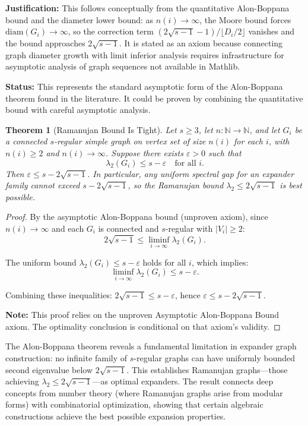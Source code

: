\documentclass[11pt]{article}
\theoremstyle{plain}
\newtheorem*{theorem}{Theorem}
\theoremstyle{definition}
\theoremstyle{remark}
\begin{document}
\textbf{Justification:} This follows conceptually from the quantitative Alon-Boppana bound and the diameter lower bound: as $n(i) \to \infty$, the Moore bound forces $\text{diam}(G_i) \to \infty$, so the correction term $(2\sqrt{s-1} - 1)/\lfloor D_i/2 \rfloor$ vanishes and the bound approaches $2\sqrt{s-1}$. It is stated as an axiom because connecting graph diameter growth with limit inferior analysis requires infrastructure for asymptotic analysis of graph sequences not available in Mathlib.

\textbf{Status:} This represents the standard asymptotic form of the Alon-Boppana theorem found in the literature. It could be proven by combining the quantitative bound with careful asymptotic analysis.

\begin{theorem}[Ramanujan Bound Is Tight]
Let $s \geq 3$, let $n : \mathbb{N} \to \mathbb{N}$, and let $G_i$ be a connected $s$-regular simple graph on vertex set of size $n(i)$ for each $i$, with $n(i) \geq 2$ and $n(i) \to \infty$. Suppose there exists $\varepsilon > 0$ such that
\[
\lambda_2(G_i) \leq s - \varepsilon \quad \text{for all } i.
\]
Then $\varepsilon \leq s - 2\sqrt{s-1}$. In particular, any uniform spectral gap for an expander family cannot exceed $s - 2\sqrt{s-1}$, so the Ramanujan bound $\lambda_2 \leq 2\sqrt{s-1}$ is best possible.
\end{theorem}

\begin{proof}
By the asymptotic Alon-Boppana bound (unproven axiom), since $n(i) \to \infty$ and each $G_i$ is connected and $s$-regular with $|V_i| \geq 2$:
\[
2\sqrt{s-1} \leq \liminf_{i \to \infty} \lambda_2(G_i).
\]

The uniform bound $\lambda_2(G_i) \leq s - \varepsilon$ holds for all $i$, which implies:
\[
\liminf_{i \to \infty} \lambda_2(G_i) \leq s - \varepsilon.
\]

Combining these inequalities: $2\sqrt{s-1} \leq s - \varepsilon$, hence $\varepsilon \leq s - 2\sqrt{s-1}$.

\textbf{Note:} This proof relies on the unproven Asymptotic Alon-Boppana Bound axiom. The optimality conclusion is conditional on that axiom's validity.
\end{proof}

The Alon-Boppana theorem reveals a fundamental limitation in expander graph construction: no infinite family of $s$-regular graphs can have uniformly bounded second eigenvalue below $2\sqrt{s-1}$. This establishes Ramanujan graphs—those achieving $\lambda_2 \leq 2\sqrt{s-1}$—as optimal expanders. The result connects deep concepts from number theory (where Ramanujan graphs arise from modular forms) with combinatorial optimization, showing that certain algebraic constructions achieve the best possible expansion properties.
\end{document}
